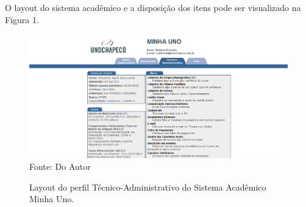 O layout do sistema acadêmico e a disposição dos itens pode ser visualizado na Figura 1.


\begin{figure}[!htb]
     \centering
     \caption[Layout do Sistema - Perfil Técnico-Administrativo]{Layout do perfil Técnico-Administrativo do Sistema Acadêmico Minha Uno.}
     \includegraphics[scale=0.4]{imagens/tecnico.png}
     \\ Fonte: Do Autor
\end{figure}